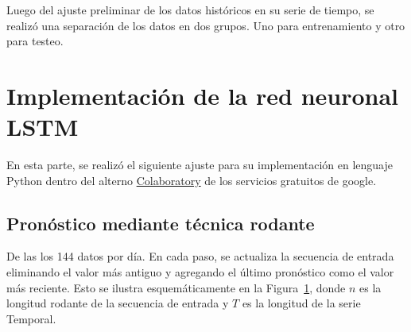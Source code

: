 \documentclass[
  us-letterpaper,
]{scrreprt}
\theoremstyle{plain}
\theoremstyle{definition}
\theoremstyle{definition}
\theoremstyle{remark}
\begin{document}
Luego del ajuste preliminar de los datos históricos en su serie de
tiempo, se realizó una separación de los datos en dos grupos. Uno para
entrenamiento y otro para testeo.

\section{Implementación de la red neuronal
LSTM}\label{sec-implementaciuxf3n-de-la-red-neuronal-lstm}

En esta parte, se realizó el siguiente ajuste para su implementación en
lenguaje Python dentro del alterno \hyperref[sec-colab]{Colaboratory} de
los servicios gratuitos de google.

\subsection{Pronóstico mediante técnica
rodante}\label{pronuxf3stico-mediante-tuxe9cnica-rodante}

De las los 144 datos por día. En cada paso, se actualiza la secuencia de
entrada eliminando el valor más antiguo y agregando el último pronóstico
como el valor más reciente. Esto se ilustra esquemáticamente en la
Figura~\ref{fig-rodante}, donde \(n\) es la longitud rodante de la
secuencia de entrada y \(T\) es la longitud de la serie Temporal.

\begin{figure}


\caption{\label{fig-rodante}}

\end{figure}%
\end{document}
